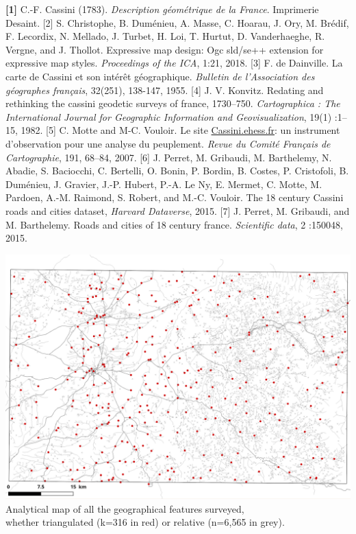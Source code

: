 \documentclass[portrait, A0]{sciposter}
\begin{document}
\begin{minipage}[b]{75cm}
\begin{multicols}{3}
\small
\textbf{[1]} C.-F. Cassini (1783). \textit{Description géométrique de la France}. Imprimerie Desaint.
[2] S. Christophe, B. Duménieu, A. Masse, C. Hoarau, J. Ory, M. Brédif, F. Lecordix, N. Mellado, J. Turbet, H. Loi, T. Hurtut, D. Vanderhaeghe, R. Vergne, and J. Thollot. Expressive map design: Ogc sld/se++ extension for expressive map styles. \textit{Proceedings of the ICA}, 1:21, 2018.
[3] F. de Dainville. La carte de Cassini et son intérêt géographique. \textit{Bulletin de l'Association des géographes français}, 32(251), 138-147, 1955.
[4] J. V. Konvitz. Redating and rethinking the cassini geodetic surveys of france, 1730–750. \textit{Cartographica : The International Journal for Geographic Information and Geovisualization}, 19(1) :1–15, 1982.
[5] C. Motte and M-C. Vouloir. Le site \href{http://cassini.ehess.fr}{Cassini.ehess.fr}: un instrument d’observation pour une analyse du peuplement. \textit{Revue du Comité Français de Cartographie}, 191, 68–84, 2007.
[6] J. Perret, M. Gribaudi, M. Barthelemy, N. Abadie, S. Baciocchi, C. Bertelli, O. Bonin, P. Bordin, B. Costes, P. Cristofoli, B. Duménieu, J. Gravier, J.-P. Hubert, P.-A. Le Ny, E. Mermet, C. Motte, M. Pardoen, A.-M. Raimond, S. Robert, and M.-C. Vouloir. The 18 century Cassini roads and cities dataset, \textit{Harvard Dataverse}, 2015.
[7] J. Perret, M. Gribaudi, and M. Barthelemy. Roads and cities of 18 century france. \textit{Scientific data}, 2 :150048, 2015.

\begin{center}
 \includegraphics[width=21cm]{gfx/Triangulated.png}
 \label{map:triangulated-relative}
 \vfill
  Analytical map of all the geographical features surveyed,\\ whether triangulated (k=316 in red) or relative (n=6,565 in grey).
 \end{center}
 
\end{multicols}
\end{minipage}
\end{document}
